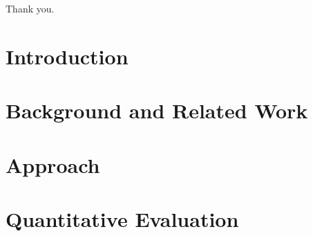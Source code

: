 \documentclass[
     12pt,                    %
     a4paper,             %
     BCOR10mm,     %
     DIV14,                 %
     listof=totoc,                    %
     bibliography=totoc,       %
     index=totoc,              %
     twoside,
     headsepline
     ]{scrreprt}
\begin{document}
Thank you.

\cleardoublepage

\tableofcontents
\cleardoublepage
{} 

\listoffigures
\listoftables
\cleardoublepage


\chapter{Introduction}\label{chap:intro}





\chapter{Background and Related Work}\label{chap:background}



\chapter{Approach}\label{chap:approach}



\chapter{Quantitative Evaluation}\label{chap:evaluation}


\end{document}
